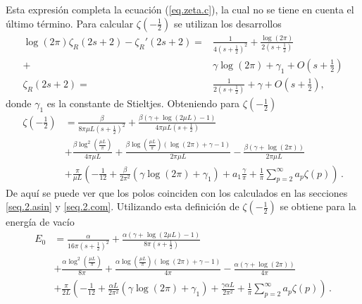 Esta expresión completa la ecuación (\ref{eq.zeta.c}), la cual no se tiene en cuenta el último término.
Para calcular $\zeta \left( - \frac{1}{2} \right)$ se utilizan los desarrollos
\begin{align}\label{cortar}
	\log (2 \pi) \zeta _R (2s+2) -
	\zeta _R ' (2s+2) = & 
	\frac{1}{4 \left( s + \frac{1}{2} \right) ^2} + 
	\frac{ \log (2 \pi ) }{2 \left( s + \frac{1}{2} \right) } \\
	+ &  \gamma \log (2 \pi ) + \gamma _1 + O \left( s + \frac{1}{2} \right) \\
	\zeta _R (2s+2) = &\frac{1}{2 \left( s + \frac{1}{2} \right)} + \gamma + O \left( s + \frac{1}{2} \right)
	 ,
\end{align}
donde $\gamma _1$ es la constante de Stieltjes. Obteniendo para $\zeta \left( - \frac{1}{2} \right) $
\begin{align}\label{eq.zeta.final}
\zeta \left( - \frac{1}{2} \right) &=
		\frac{\beta}{8  \pi \mu L \left(s + \frac{1}{2} \right)^2}	 +
	    \frac{
	    	\beta ( \gamma  +  \log (2 \mu L ) -1 ) }
	    	{4  \pi \mu L \left(s + \frac{1}{2} \right) } 
\\[5pt]
\nonumber
&
+
		\frac{\beta \log ^2 \left( \frac{\mu L}{\pi} \right)}{4 \pi \mu L}  +
		\frac{
			\beta \log \left( \frac{\mu L}{\pi}\right)
				( \log (2 \pi ) + \gamma -1)}
			{2 \pi \mu L}  
- \frac{\beta (\gamma + \log(2 \pi) )}{2 \pi \mu L}
\\[5pt]
\nonumber
&
+
\frac{\pi}{\mu L}  
					\left(
							- \frac{1}{12} +
							\frac{\beta}{2 \pi ^2} \left(
														\gamma \log (2 \pi)
														+ \gamma _1
														\right) +
								a _1 \frac{\gamma}{\pi} +
								\frac{1}{\pi} \sum _{p=2} ^{\infty}
								a_p \zeta (p) 
							\right) 
\, .
\end{align}
De aquí se puede ver que los polos coinciden con los calculados en las secciones \ref{seq.2.asin} y \ref{seq.2.com}. Utilizando esta definición de $\zeta \left( - \frac{1}{2} \right) $ se obtiene para la energía de vacío
\begin{align}\label{energia.vacio.final}
	E_ 0 &=
		\frac{\alpha}{16  \pi  \left(s + \frac{1}{2} \right)^2}	 
		+   \frac{
	    	\alpha ( \gamma  +  \log (2\mu L ) -1 ) }
	    	{8  \pi \left(s+ \frac{1}{2} \right) } 
\\[5pt]
\nonumber
&+
	\frac{\alpha \log ^2 \left( \frac{\mu L}{\pi} \right)}{8 \pi}  +
		\frac{ 
			\alpha \log \left( \frac{\mu L}{\pi}\right)
				( \log (2 \pi ) + \gamma -1)}
			{4 \pi }  
	- \frac{\alpha (\gamma + \log (2 \pi ) )}{4 \pi}
\\[5pt]
\nonumber
&
+
	\frac{\pi}{2 L}  
			\left(
				- \frac{1}{12} +
				\frac{\alpha L}{2 \pi ^2} 
				\left(
					\gamma \log (2 \pi)
					+ \gamma _1
					\right) +
								\frac{\gamma \alpha L}{2 \pi ^2} +
								\frac{1}{\pi} \sum _{p=2} ^{\infty}
								a_p \zeta (p) 
							\right) 
\, .
\end{align}
